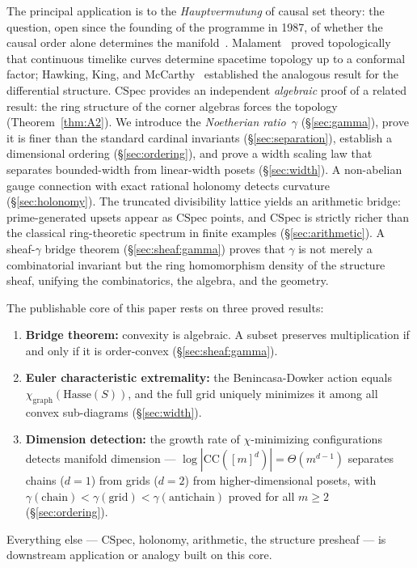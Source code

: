 \documentclass[11pt,a4paper]{article}
\theoremstyle{plain}
\theoremstyle{definition}
\theoremstyle{remark}
\newcommand{\CSpec}{\mathrm{CSpec}}
\newcommand{\CC}{\mathrm{CC}}
\begin{document}
The principal application is to the \emph{Hauptvermutung} of causal set theory: the question, open since the founding of the programme in 1987, of whether the causal order alone determines the manifold~\cite{sorkin2003, malament1977, brightwell2015}.
Malament~\cite{malament1977} proved topologically that continuous timelike curves determine spacetime topology up to a conformal factor; Hawking, King, and McCarthy~\cite{hawking1976} established the analogous result for the differential structure.
$\CSpec$ provides an independent \emph{algebraic} proof of a related result: the ring structure of the corner algebras forces the topology (Theorem~\ref{thm:A2}).
We introduce the \emph{Noetherian ratio}~$\gamma$ (\S\ref{sec:gamma}), prove it is finer than the standard cardinal invariants (\S\ref{sec:separation}), establish a dimensional ordering (\S\ref{sec:ordering}), and prove a width scaling law that separates bounded-width from linear-width posets (\S\ref{sec:width}).
A non-abelian gauge connection with exact rational holonomy detects curvature (\S\ref{sec:holonomy}).
The truncated divisibility lattice yields an arithmetic bridge: prime-generated upsets appear as $\CSpec$ points, and $\CSpec$ is strictly richer than the classical ring-theoretic spectrum in finite examples (\S\ref{sec:arithmetic}).
A sheaf-$\gamma$ bridge theorem (\S\ref{sec:sheaf:gamma}) proves that $\gamma$ is not merely a combinatorial invariant but the ring homomorphism density of the structure sheaf, unifying the combinatorics, the algebra, and the geometry.


The publishable core of this paper rests on three proved results:
\begin{enumerate}[nosep]
\item \textbf{Bridge theorem:} convexity is algebraic.
A subset preserves multiplication if and only if it is
order-convex (\S\ref{sec:sheaf:gamma}).
\item \textbf{Euler characteristic extremality:} the
Benincasa-Dowker action equals $\chi_{\mathrm{graph}}(\mathrm{Hasse}(S))$,
and the full grid uniquely minimizes it among all convex
sub-diagrams (\S\ref{sec:width}).
\item \textbf{Dimension detection:} the growth rate of
$\chi$-minimizing configurations detects manifold dimension ---
$\log|\CC([m]^d)| = \Theta(m^{d-1})$ separates chains ($d = 1$)
from grids ($d = 2$) from higher-dimensional posets, with
$\gamma(\text{chain}) < \gamma(\text{grid}) <
\gamma(\text{antichain})$ proved for all $m \geq 2$
(\S\ref{sec:ordering}).
\end{enumerate}
Everything else --- $\CSpec$, holonomy, arithmetic, the
structure presheaf --- is downstream application or analogy
built on this core.
\end{document}
